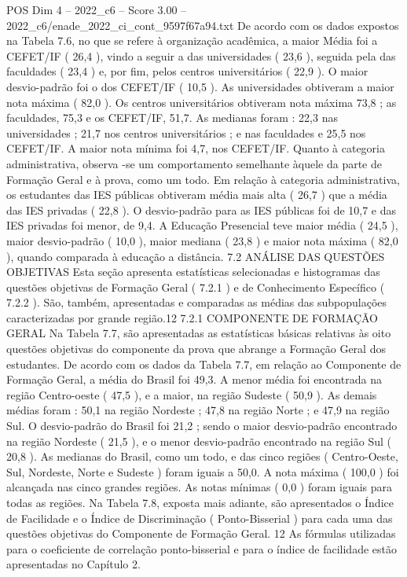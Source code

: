 \begin{textsample}{POS Dim 4 – 2022\_c6 – Score 3.00 – 2022\_c6/enade\_2022\_ci\_cont\_9597f67a94.txt}
De acordo com os dados expostos na Tabela 7.6, no que se refere à organização acadêmica, a maior Média foi a CEFET/IF ( 26,4 ), vindo a seguir a das universidades ( 23,6 ), seguida pela das faculdades ( 23,4 ) e, por fim, pelos centros universitários ( 22,9 ).
O maior desvio-padrão foi o dos CEFET/IF ( 10,5 ).
As universidades obtiveram a maior nota máxima ( 82,0 ).
Os centros universitários obtiveram nota máxima 73,8 ; as faculdades, 75,3 e os CEFET/IF, 51,7.
As medianas foram : 22,3 nas universidades ; 21,7 nos centros universitários ; e nas faculdades e 25,5 nos CEFET/IF.
A maior nota mínima foi 4,7, nos CEFET/IF.
Quanto à categoria administrativa, observa -se um comportamento semelhante àquele da parte de Formação Geral e à prova, como um todo.
Em relação à categoria administrativa, os estudantes das IES públicas obtiveram média mais alta ( 26,7 ) que a média das IES privadas ( 22,8 ).
O desvio-padrão para as IES públicas foi de 10,7 e das IES privadas foi menor, de 9,4.
A Educação Presencial teve maior média ( 24,5 ), maior desvio-padrão ( 10,0 ), maior mediana ( 23,8 ) e maior nota máxima ( 82,0 ), quando comparada à educação a distância. 7.2 ANÁLISE DAS QUESTÕES OBJETIVAS Esta seção apresenta estatísticas selecionadas e histogramas das questões objetivas de Formação Geral ( 7.2.1 ) e de Conhecimento Específico ( 7.2.2 ).
São, também, apresentadas e comparadas as médias das subpopulações caracterizadas por grande região.12 7.2.1 COMPONENTE DE FORMAÇÃO GERAL Na Tabela 7.7, são apresentadas as estatísticas básicas relativas às oito questões objetivas do componente da prova que abrange a Formação Geral dos estudantes.
De acordo com os dados da Tabela 7.7, em relação ao Componente de Formação Geral, a média do Brasil foi 49,3.
A menor média foi encontrada na região Centro-oeste ( 47,5 ), e a maior, na região Sudeste ( 50,9 ).
As demais médias foram : 50,1 na região Nordeste ; 47,8 na região Norte ; e 47,9 na região Sul.
O desvio-padrão do Brasil foi 21,2 ; sendo o maior desvio-padrão encontrado na região Nordeste ( 21,5 ), e o menor desvio-padrão encontrado na região Sul ( 20,8 ).
As medianas do Brasil, como um todo, e das cinco regiões ( Centro-Oeste, Sul, Nordeste, Norte e Sudeste ) foram iguais a 50,0.
A nota máxima ( 100,0 ) foi alcançada nas cinco grandes regiões.
As notas mínimas ( 0,0 ) foram iguais para todas as regiões.
Na Tabela 7.8, exposta mais adiante, são apresentados o Índice de Facilidade e o Índice de Discriminação ( Ponto-Bisserial ) para cada uma das questões objetivas do Componente de Formação Geral. 12 As fórmulas utilizadas para o coeficiente de correlação ponto-bisserial e para o índice de facilidade estão apresentadas no Capítulo 2.

\end{textsample}
